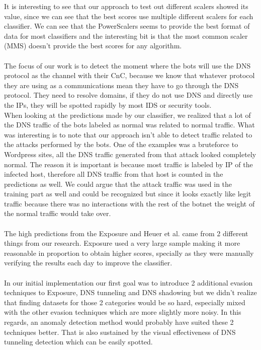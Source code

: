 It is interesting to see that our approach to test out different scalers showed its value, since we can see that the best scores use multiple different scalers for each classifier. We can see that the PowerScalers seems to provide the best format of data for most classifiers and the interesting bit is that the most common scaler (MMS) doesn't provide the best scores for any algorithm.\\
\\
The focus of our work is to detect the moment where the bots will use the DNS protocol as the channel with their CnC, because we know that whatever protocol they are using as a communications mean they have to go through the DNS protocol. They need to resolve domains, if they do not use DNS and directly use the IPs, they will be spotted rapidly by most IDS or security tools.\\
When looking at the predictions made by our classifier, we realized that a lot of the DNS traffic of the bots labeled as normal was related to normal traffic. What was interesting is to note that our approach isn't able to detect traffic related to the attacks performed by the bots. One of the examples was a bruteforce to Wordpress sites, all the DNS traffic generated from that attack looked completely normal. The reason it is important is because most traffic is labeled by IP of the infected host, therefore all DNS traffic from that host is counted in the predictions as well. We could argue that the attack traffic was used in the training part as well and could be recognized but since it looks exactly like legit traffic because there was no interactions with the rest of the botnet the weight of the normal traffic would take over.\\
\\
The high predictions from the Exposure and Heuer et al. came from 2 different things from our research. Exposure used a very large sample making it more reasonable in proportion to obtain higher scores, specially as they were manually verifying the results each day to improve the classifier.\\
\\
In our initial implementation our first goal was to introduce 2 additional evasion techniques to Exposure, DNS tunneling and DNS shadowing but we didn't realize that finding datasets for those 2 categories would be so hard, especially mixed with the other evasion techniques which are more slightly more noisy. In this regards, an anomaly detection method would probably have suited these 2 techniques better. That is also sustained by the visual effectiveness of DNS tunneling detection which can be easily spotted.\\
\\

